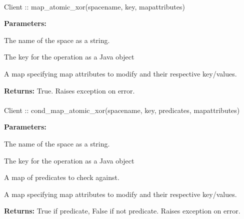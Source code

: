 \paragraph{}
\label{api:java:map_atomic_xor}
\begin{javacode}
Client :: map_atomic_xor(spacename, key, mapattributes)
\end{javacode}


\noindent\textbf{Parameters:}
\begin{description}[labelindent=\widthof{{\code{mapattributes}}},leftmargin=*,noitemsep,nolistsep,align=right]
\item[\code{spacename}] The name of the space as a string.
\item[\code{key}] The key for the operation as a Java object
\item[\code{mapattributes}] A map specifying map attributes to modify and their respective key/values.
\end{description}

\noindent\textbf{Returns:}
True.  Raises exception on error.

\paragraph{}
\label{api:java:cond_map_atomic_xor}
\begin{javacode}
Client :: cond_map_atomic_xor(spacename, key, predicates, mapattributes)
\end{javacode}


\noindent\textbf{Parameters:}
\begin{description}[labelindent=\widthof{{\code{mapattributes}}},leftmargin=*,noitemsep,nolistsep,align=right]
\item[\code{spacename}] The name of the space as a string.
\item[\code{key}] The key for the operation as a Java object
\item[\code{predicates}] A map of predicates to check against.
\item[\code{mapattributes}] A map specifying map attributes to modify and their respective key/values.
\end{description}

\noindent\textbf{Returns:}
True if predicate, False if not predicate.  Raises exception on error.

